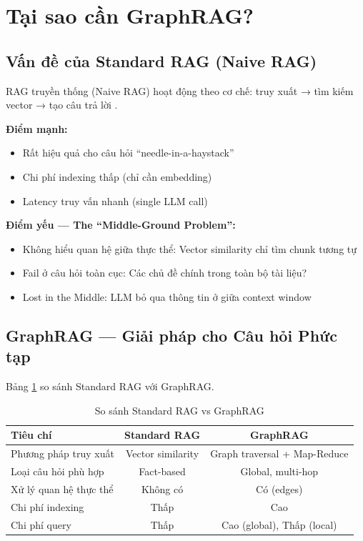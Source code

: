 \documentclass[conference]{IEEEtran}
\begin{document}
\section{Tại sao cần GraphRAG?}

\subsection{Vấn đề của Standard RAG (Naive RAG)}

RAG truyền thống (Naive RAG) hoạt động theo cơ chế: truy xuất → tìm kiếm vector → tạo câu trả lời \cite{lewis2020rag}.

\textbf{Điểm mạnh:}
\begin{itemize}
    \item Rất hiệu quả cho câu hỏi ``needle-in-a-haystack''
    \item Chi phí indexing thấp (chỉ cần embedding)
    \item Latency truy vấn nhanh (single LLM call)
\end{itemize}

\textbf{Điểm yếu --- The ``Middle-Ground Problem'':}
\begin{itemize}
    \item Không hiểu quan hệ giữa thực thể: Vector similarity chỉ tìm chunk tương tự
    \item Fail ở câu hỏi toàn cục: Các chủ đề chính trong toàn bộ tài liệu?
    \item Lost in the Middle: LLM bỏ qua thông tin ở giữa context window
\end{itemize}

\subsection{GraphRAG --- Giải pháp cho Câu hỏi Phức tạp}

Bảng \ref{tab:comparison} so sánh Standard RAG với GraphRAG.

\begin{table}[htbp]
\caption{So sánh Standard RAG vs GraphRAG}
\begin{center}
\begin{tabular}{|l|c|c|}
\hline
\textbf{Tiêu chí} & \textbf{Standard RAG} & \textbf{GraphRAG} \\
\hline
Phương pháp truy xuất & Vector similarity & Graph traversal + Map-Reduce \\
\hline
Loại câu hỏi phù hợp & Fact-based & Global, multi-hop \\
\hline
Xử lý quan hệ thực thể & Không có & Có (edges) \\
\hline
Chi phí indexing & Thấp & Cao \\
\hline
Chi phí query & Thấp & Cao (global), Thấp (local) \\
\hline
\end{tabular}
\end{center}
\label{tab:comparison}
\end{table}
\end{document}
